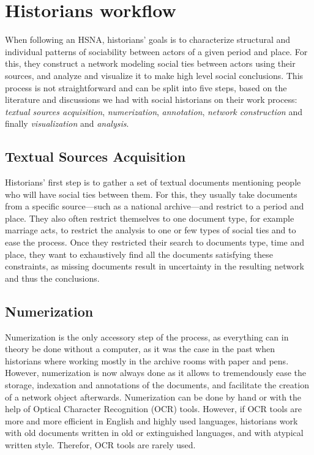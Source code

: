 \documentclass{vgtc}                          %
\begin{document}
\section{Historians workflow}

When following an HSNA, historians' goals is to characterize structural and individual patterns of sociability between actors of a given period and place. For this, they construct a network modeling social ties between actors using their sources, and analyze and visualize it to make high level social conclusions. This process is not straightforward and can be split into five steps, based on the literature \cite{dufournaud_recherche_2015} and discussions we had with social historians on their work process: \textit{textual sources acquisition}, \textit{numerization}, \textit{annotation}, \textit{network construction} and finally \textit{visualization} and \textit{analysis}.

\subsection{Textual Sources Acquisition}

Historians' first step is to gather a set of textual documents mentioning people who will have social ties between them. For this, they usually take documents from a specific source---such as a national archive---and restrict to a period and place. They also often restrict themselves to one document type, for example marriage acts, to restrict the analysis to one or few types of social ties and to ease the process. Once they restricted their search to documents type, time and place, they want to exhaustively find all the documents satisfying these constraints, as missing documents result in uncertainty in the resulting network and thus the conclusions.

\subsection{Numerization}

Numerization is the only accessory step of the process, as everything can in theory be done without a computer, as it was the case in the past when historians where working mostly in the archive rooms with paper and pens. However, numerization is now always done as it allows to tremendously ease the storage, indexation and annotations of the documents, and facilitate the creation of a network object afterwards.
Numerization can be done by hand or with the help of Optical Character Recognition (OCR) tools. However, if OCR tools are more and more efficient in English and highly used languages, historians work with old documents written in old or extinguished languages, and with atypical written style. Therefor, OCR tools are rarely used.  
\end{document}
